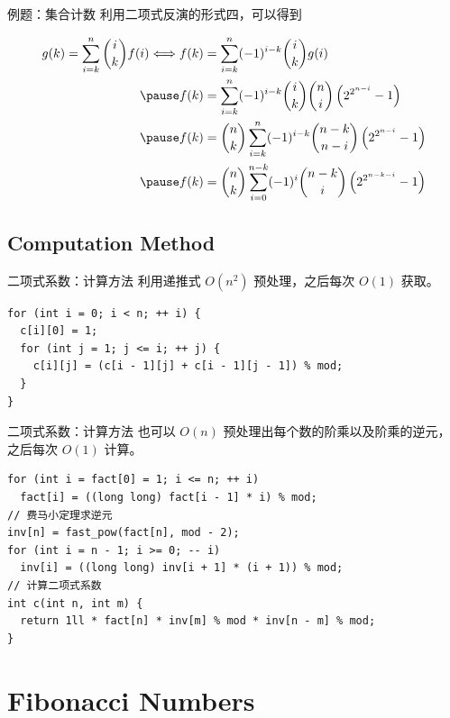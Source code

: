 \documentclass[12pt,aspectratio=169]{beamer}
\begin{document}
\begin{frame}[fragile]{例题：集合计数}
利用二项式反演的形式四，可以得到

$$
\begin{aligned}
g(k) = \sum_{i=k}^{n} {i \choose k} f(i) \Longleftrightarrow
f(k) &= \sum_{i=k}^{n} (-1)^{i-k} {i \choose k} g(i) \\ \pause
f(k) &= \sum_{i=k}^{n} (-1)^{i-k} {i \choose k} {n \choose i} \left(2^{2^{n-i}}-1\right) \\ \pause
f(k) &= {n \choose k} \sum_{i=k}^{n} (-1)^{i-k} {n - k \choose n - i} \left(2^{2^{n-i}}-1\right) \\ \pause
f(k) &= {n \choose k} \sum_{i=0}^{n-k} (-1)^{i} {n - k \choose i} \left(2^{2^{n-k-i}}-1\right) \\
\end{aligned}
$$
\end{frame}

\subsection[计算方法]{Computation Method}

\begin{frame}[fragile]{二项式系数：计算方法}
利用递推式 $O(n^2)$ 预处理，之后每次 $O(1)$ 获取。

\begin{verbatim}
for (int i = 0; i < n; ++ i) {
  c[i][0] = 1;
  for (int j = 1; j <= i; ++ j) {
    c[i][j] = (c[i - 1][j] + c[i - 1][j - 1]) % mod;
  }
}
\end{verbatim}
\end{frame}

\begin{frame}[fragile]{二项式系数：计算方法}
也可以 $O(n)$ 预处理出每个数的阶乘以及阶乘的逆元，之后每次 $O(1)$ 计算。

\begin{verbatim}
for (int i = fact[0] = 1; i <= n; ++ i)
  fact[i] = ((long long) fact[i - 1] * i) % mod;
// 费马小定理求逆元
inv[n] = fast_pow(fact[n], mod - 2);
for (int i = n - 1; i >= 0; -- i)
  inv[i] = ((long long) inv[i + 1] * (i + 1)) % mod;
// 计算二项式系数
int c(int n, int m) {
  return 1ll * fact[n] * inv[m] % mod * inv[n - m] % mod;
}
\end{verbatim}
\end{frame}

\section[斐波那契数]{Fibonacci Numbers}
\end{document}
